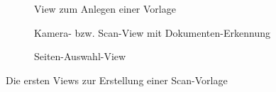 \documentclass[notables, nomenclature, oneside, 150]{HSMW-Thesis}
\begin{document}
\begin{figure}[h!]
\begin{subfigure}[t]{0.3\textwidth}
        			\caption{View zum Anlegen einer Vorlage}
        			\label{fig:v2}
    			\end{subfigure}
    			\begin{subfigure}[t]{0.3\textwidth}
        			\caption{Kamera- bzw. Scan-View mit Dokumenten-Erkennung}
        			\label{fig:v3}
    			\end{subfigure}
    			\begin{subfigure}[t]{0.3\textwidth}
        			\caption{Seiten-Auswahl-View}
        			\label{fig:v4}
    			\end{subfigure}
    			\caption{Die ersten Views zur Erstellung einer Scan-Vorlage}\label{fig:erstellung1}
			\end{figure}
			
\end{document}
